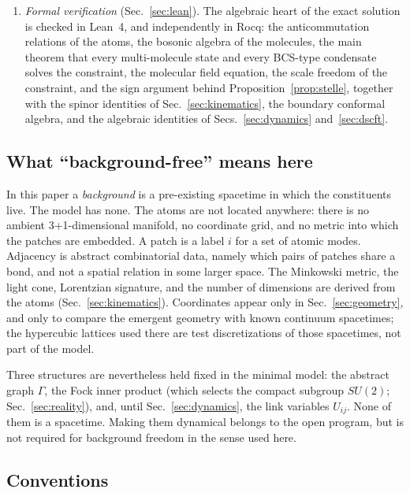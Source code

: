 \documentclass[reprint,aps,prd,amsmath,amssymb,superscriptaddress,nofootinbib,floatfix]{revtex4-2}
\theoremstyle{plain}
\theoremstyle{definition}
\theoremstyle{remark}
\begin{document}
\begin{enumerate}
atoms and boundary operators is proposed (Conjecture~\ref{conj:shadow}).
\item \emph{Formal verification} (Sec.~\ref{sec:lean}). The algebraic heart of the exact solution is checked in
Lean~4, and independently in Rocq: the anticommutation relations of the atoms, the bosonic algebra of the molecules,
the main theorem that every multi-molecule state and every BCS-type condensate solves the constraint, the molecular
field equation, the scale freedom of the constraint, and the sign argument behind Proposition~\ref{prop:stelle}, together with the spinor identities of Sec.~\ref{sec:kinematics}, the boundary conformal algebra, and
the algebraic identities of Secs.~\ref{sec:dynamics} and~\ref{sec:dscft}.
\end{enumerate}

\subsection{What ``background-free'' means here}
\label{sec:background}

In this paper a \emph{background} is a pre-existing spacetime in which the constituents live. The model has
none. The atoms are not located anywhere: there is no ambient 3+1-dimensional manifold, no coordinate grid,
and no metric into which the patches are embedded. A patch is a label $i$ for a set of atomic modes.
Adjacency is abstract combinatorial data, namely which pairs of patches share a bond, and not a spatial
relation in some larger space. The Minkowski metric, the light cone, Lorentzian signature, and the number of
dimensions are derived from the atoms (Sec.~\ref{sec:kinematics}). Coordinates appear only in
Sec.~\ref{sec:geometry}, and only to compare the emergent geometry with known continuum spacetimes; the
hypercubic lattices used there are test discretizations of those spacetimes, not part of the model.

Three structures are nevertheless held fixed in the minimal model: the abstract graph $\Gamma$, the Fock inner
product (which selects the compact subgroup $SU(2)$; Sec.~\ref{sec:reality}), and, until
Sec.~\ref{sec:dynamics}, the link variables $U_{ij}$. None of them is a spacetime. Making them dynamical belongs to
the open program, but is not required for background freedom in the sense used here.

\subsection{Conventions}
\label{sec:conventions}
\end{document}
